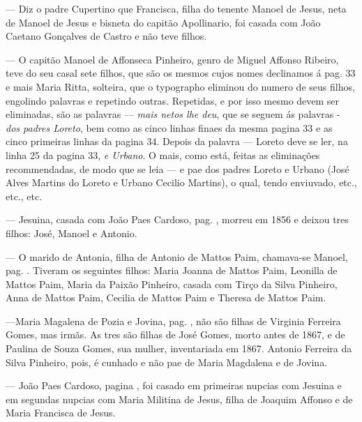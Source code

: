 — Diz o padre Cupertino que Francisca, filha do tenente Manoel de Jesus, neta de Manoel de Jesus e bisneta do capitão Apollinario, foi casada com João Caetano Gonçalves de Castro e não teve filhos.

— O capitão Manoel de Affonseca Pinheiro, genro de Miguel Affonso Ribeiro, teve do seu casal sete filhos, que são os mesmos cujos nomes declinamos á pag. 33 e mais Maria Ritta, solteira, que o typographo eliminou do numero de seus filhos, engolindo palavras e repetindo outras. Repetidas, e por isso mesmo devem ser eliminadas, são as palavras — \textit{mais netos lhe deu}, que se seguem ás palavras - \textit{dos padres Loreto}, bem como as cinco linhas finaes da mesma pagina 33 e as cinco primeiras linhas da pagina 34. Depois da palavra — Loreto deve se ler, na linha 25 da pagina 33, \textit{e Urbano}. O mais, como está, feitas as eliminações recommendadas, de modo que se leia — e pae dos padres Loreto e Urbano (José Alves Martins do Loreto e Urbano Cecilio Martins), o qual, tendo enviuvado, etc., etc., etc.


— Jesuina, casada com João Paes Cardoso, pag. \pageref{jesuina}, morreu em 1856 e deixou tres filhos: José, Manoel e Antonio.

— O marido de Antonia, filha de Antonio de Mattos Paim, chamava-se Manoel, pag. \pageref{ampaim}. Tiveram os seguintes filhos:  Maria Joanna de Mattos Paim, Leonilla de Mattos Paim, Maria da Paixão Pinheiro, casada com Tirço da Silva Pinheiro, Anna de Mattos Paim, Cecilia de Mattos Paim e Theresa de Mattos Paim.

—Maria Magalena de Pozia e Jovina, pag. \pageref{mmagdalena}, não são filhas de Virginia Ferreira Gomes, mas irmãs. As tres são filhas de José Gomes, morto antes de 1867, e de Paulina de Souza Gomes, sua mulher, inventariada em 1867. Antonio Ferreira da Silva Pinheiro, pois, é cunhado e não pae de Maria Magdalena e de Jovina.

— João Paes Cardoso, pagina \pageref{jesuina}, foi casado em primeiras nupcias com Jesuina e em segundas nupcias com Maria Militina de Jesus, filha de Joaquim Affonso e de Maria Francisca de Jesus.


